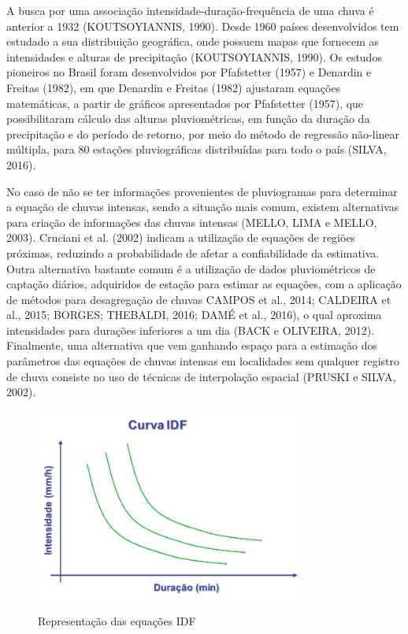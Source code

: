 A busca por uma associação intensidade-duração-frequência de uma chuva é anterior a 1932 (KOUTSOYIANNIS, 1990). Desde 1960 países desenvolvidos tem estudado a sua distribuição geográfica, onde possuem mapas que fornecem as intensidades e alturas de precipitação (KOUTSOYIANNIS, 1990). Os estudos pioneiros no Brasil foram desenvolvidos por Pfafstetter (1957) e Denardin e Freitas (1982), em que Denardin e Freitas (1982) ajustaram equações matemáticas, a partir de gráficos apresentados por Pfafstetter (1957), que possibilitaram cálculo das alturas pluviométricas, em função da duração da precipitação e do período de retorno, por meio do método de regressão não-linear múltipla, para 80 estações pluviográficas distribuídas para todo o país (SILVA, 2016).

No caso de não se ter informações provenientes de pluviogramas para determinar a equação de chuvas intensas, sendo a situação mais comum, existem alternativas para criação de informações das chuvas intensas (MELLO, LIMA e MELLO, 2003). Cruciani et al. (2002) indicam a utilização de equações de regiões próximas, reduzindo a probabilidade de afetar a confiabilidade da estimativa. Outra alternativa bastante comum é a utilização de dados pluviométricos de captação diários, adquiridos de estação para estimar as equações, com a aplicação de métodos para desagregação de chuvas CAMPOS et al., 2014; CALDEIRA et al., 2015; BORGES; THEBALDI, 2016; DAMÉ et al., 2016), o qual aproxima intensidades para durações inferiores a um dia (BACK e OLIVEIRA, 2012). Finalmente, uma alternativa que vem ganhando espaço para a estimação dos parâmetros das equações de chuvas intensas em localidades sem qualquer registro de chuva consiste no uso de técnicas de interpolação espacial (PRUSKI e SILVA, 2002).

\begin{figure}
    \caption{Representação das equações IDF}
    \centering
    \includegraphics[width=0.8\textwidth]{Textuais/Figuras/curva-idf.pdf}
    \label{fig:desagregacao}
\end{figure}